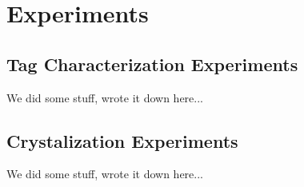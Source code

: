 \section{Experiments}
\label{sec:Experiments}

\subsection{Tag Characterization Experiments}

We did some stuff, wrote it down here...

\subsection{Crystalization Experiments}

We did some stuff, wrote it down here...


